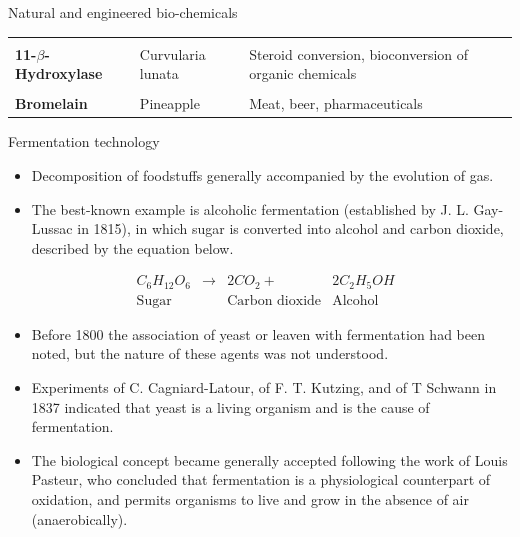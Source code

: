 \documentclass[
  ignorenonframetext,
  aspectratio=169]{beamer}
\providecommand{\tightlist}{%
  \setlength{\itemsep}{0pt}\setlength{\parskip}{0pt}}
\begin{document}
\begin{frame}{Natural and engineered bio-chemicals}
\begin{table}
\begin{tabular}[t]{>{\raggedright\arraybackslash}p{8em}>{\raggedright\arraybackslash}p{26em}>{\raggedright\arraybackslash}p{30em}}
\textbf{\cellcolor{gray!6}{Trypsin}} & \cellcolor{gray!6}{Hog and calf pancreases} & \cellcolor{gray!6}{Meat, pharmaceuticals}\\
\textbf{11-$\beta$-Hydroxylase} & Curvularia lunata & Steroid conversion, bioconversion of organic chemicals\\
\addlinespace
\textbf{\cellcolor{gray!6}{Ficin}} & \cellcolor{gray!6}{Figs} & \cellcolor{gray!6}{Leather, meat, pharmaceuticals}\\
\textbf{Bromelain} & Pineapple & Meat, beer, pharmaceuticals\\
\bottomrule
\end{tabular}
\end{table}
\end{frame}

\begin{frame}{Fermentation technology}
\protect\hypertarget{fermentation-technology}{}
\footnotesize

\begin{itemize}
\tightlist
\item
  Decomposition of foodstuffs generally accompanied by the evolution of
  gas.
\item
  The best-known example is alcoholic fermentation (established by J. L.
  Gay-Lussac in 1815), in which sugar is converted into alcohol and
  carbon dioxide, described by the equation below.
\end{itemize}

\[
\begin{aligned}
&C_6 H_{12} O_6 &\rightarrow &2CO_2 + &2C_2H_5OH \\
&\textrm{Sugar} &&\textrm{Carbon dioxide} &\textrm{Alcohol}
\end{aligned}
\]

\begin{itemize}
\tightlist
\item
  Before 1800 the association of yeast or leaven with fermentation had
  been noted, but the nature of these agents was not understood.
\item
  Experiments of C. Cagniard-Latour, of F. T. Kutzing, and of T Schwann
  in 1837 indicated that yeast is a living organism and is the cause of
  fermentation.
\end{itemize}

\begin{itemize}
\tightlist
\item
  The biological concept became generally accepted following the work of
  Louis Pasteur, who concluded that fermentation is a physiological
  counterpart of oxidation, and permits organisms to live and grow in
  the absence of air (anaerobically).
\end{itemize}
\end{frame}
\end{document}
